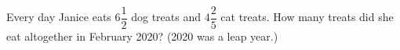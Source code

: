 Every day Janice eats $6\dfrac12$ dog treats and $4\dfrac25$ cat treats. How many treats did she eat altogether in February 2020? (2020 was a leap year.)

